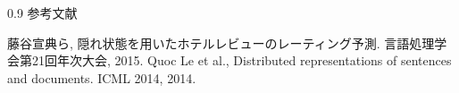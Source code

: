 \documentclass[unicode,10pt]{beamer}
\newlength{\mycolumnwidth}
\begin{document}
\begin{frame}[t]
\begin{columns}[onlytextwidth,t]
\begin{column}{0.9\mycolumnwidth}
    参考文献
    
    \begin{thebibliography}{9}
        藤谷宣典ら,
        隠れ状態を用いたホテルレビューのレーティング予測.
        言語処理学会第21回年次大会, 2015.
        Quoc Le et al.,
        Distributed representations of sentences and documents.
        ICML 2014, 2014.
    \end{thebibliography}
  \end{column}
\end{columns}

\end{frame}
\end{document}
